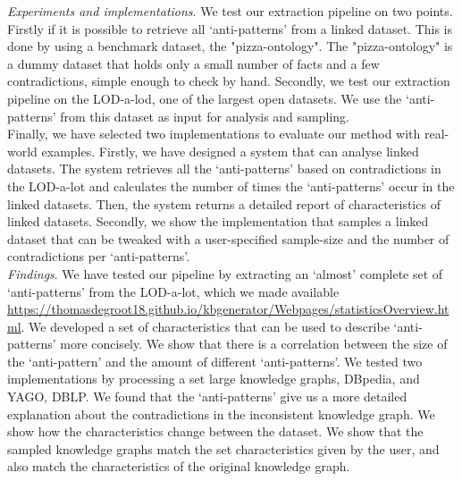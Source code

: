 \documentclass[11pt,letterpaper ,oneside ]{book}
\begin{document}
	\textit{Experiments and implementations}. We test our extraction pipeline on two points. Firstly if it is possible to retrieve all `anti-patterns' from a linked dataset. This is done by using a benchmark dataset, the "pizza-ontology". The "pizza-ontology" is a dummy dataset that holds only a small number of facts and a few contradictions, simple enough to check by hand. Secondly, we test our extraction pipeline on the LOD-a-lod, one of the largest open datasets. We use the `anti-patterns' from this dataset as input for analysis and sampling.\\
	
	Finally, we have selected two implementations to evaluate our method with real-world examples. Firstly, we have designed a system that can analyse linked datasets. The system retrieves all the  `anti-patterns' based on contradictions in the LOD-a-lot and calculates the number of times the `anti-patterns' occur in the linked datasets. Then, the system returns a detailed report of characteristics of linked datasets.
	Secondly, we show the implementation that samples a linked dataset that can be tweaked with a user-specified sample-size and the number of contradictions per `anti-patterns'. \\
	
	\textit{Findings}. We have tested our pipeline by extracting an `almost' complete set of `anti-patterns' from the LOD-a-lot\cite{JavierD:2017}, which we made available \\ \url{https://thomasdegroot18.github.io/kbgenerator/Webpages/statisticsOverview.html}. We developed a set of characteristics that can be used to describe `anti-patterns' more concisely. 
	We show that there is a correlation between the size of the `anti-pattern' and the amount of different `anti-patterns'. 
	We tested two implementations by processing a set large knowledge graphs, DBpedia\cite{DBpedia}, and YAGO\cite{YAGO}, DBLP\cite{DBLP}.
	We found that the `anti-patterns' give us a more detailed explanation about the contradictions in the inconsistent knowledge graph. 
	We show how the characteristics change between the dataset. We show that the sampled knowledge graphs match the set characteristics given by the user, and also match the characteristics of the original knowledge graph.\\
	
\end{document}

